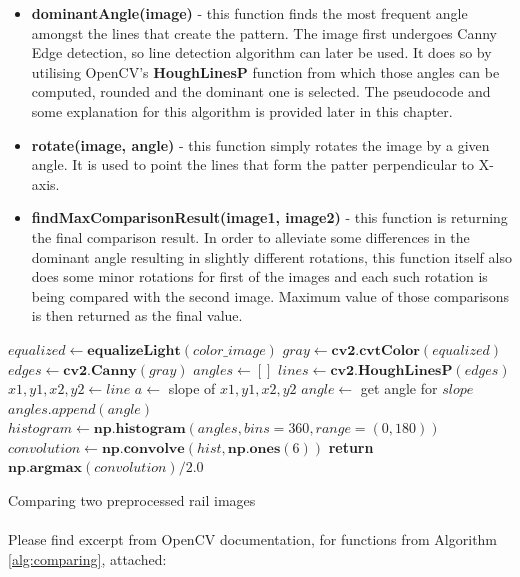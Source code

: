 \begin{itemize}
	\item \textbf{dominantAngle(image)} - this function finds the most frequent angle amongst the lines that create the pattern. The image first undergoes Canny Edge detection, so line detection algorithm can later be used. It does so by utilising OpenCV's \textbf{HoughLinesP} function from which those angles can be computed, rounded and the dominant one is selected. The pseudocode and some explanation for this algorithm is provided later in this chapter.
	\item \textbf{rotate(image, angle)} - this function simply rotates the image by a given angle. It is used to point the lines that form the patter perpendicular to X-axis.
	\item \textbf{findMaxComparisonResult(image1, image2)} - this function is returning the final comparison result. In order to alleviate some differences in the dominant angle resulting in slightly different rotations, this function itself also does some minor rotations for first of the images and each such rotation is being compared with the second image. Maximum value of those comparisons is then returned as the final value.
\end{itemize}

\begin{algorithm}
	\begin{spacing}{1.5}
	\begin{algorithmic}[1]
			\State $equalized \gets \textbf{equalizeLight}(color\_image)$
			\State $gray \gets \textbf{cv2.cvtColor}(equalized)$
			\State $edges \gets \textbf{cv2.Canny}(gray)$
			\State $angles \gets []$
			\State $lines \gets \textbf{cv2.HoughLinesP}(edges)$
				\State $x1, y1, x2, y2 \gets line$
				\State $a \gets $ slope of $x1, y1, x2, y2$
				\State $angle \gets$ get angle for $slope$
				\State $angles.append(angle)$
			\EndFor
			\State $histogram \gets \textbf{np.histogram}(angles, bins=360, range=(0, 180))$
			\State $convolution \gets \textbf{np.convolve}(hist, \textbf{np.ones}(6))$
			\State \textbf{return} $\textbf{np.argmax}(convolution) / 2.0$
		\EndFunction
	\end{algorithmic}
	\end{spacing}
	\caption{Comparing two preprocessed rail images}
	\label{alg:comparing}
\end{algorithm}

\paragraph{}
Please find excerpt from OpenCV documentation, for functions from Algorithm \ref{alg:comparing}, attached: \cite{opencv-docs}

